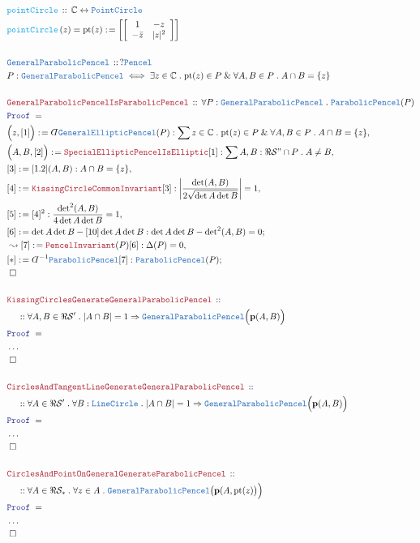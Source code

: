 \documentclass[12pt]{scrartcl}
\newcommand{\TYPE}[1]{\textcolor{NavyBlue}{\mathtt{#1}}}
\newcommand{\FUNC}[1]{\textcolor{Cerulean}{\mathtt{#1}}}
\newcommand{\LOGIC}[1]{\textcolor{Blue}{\mathtt{#1}}}
\newcommand{\THM}[1]{\textcolor{Maroon}{\mathtt{#1}}}
\renewcommand{\.}{\; . \;}
\newcommand{\de}{: \kern 0.1pc =}
\newcommand{\Act}[1]{\left( #1 \right)}
\newcommand{\Theorem}[2]{& \THM{#1} \, :: \, #2 \\ & \Proof = \\ }
\newcommand{\DeclareType}[2]{& \TYPE{#1} \, :: \, #2 \\}
\newcommand{\DefineType}[3]{& #1 : \TYPE{#2} \iff #3 \\}
\newcommand{\DeclareFunc}[2]{& \FUNC{#1} \, :: \, #2 \\}
\newcommand{\DefineNamedFunc}[4]{&  \FUNC{#1}\Act{#2} = #3 \de #4 \\}
\newcommand{\NewLine}{\\ & \kern 1pc}
\newcommand{\Page}[1]{ \begin{align*} #1 \end{align*}   }
\newcommand{ \bd }{ \ByDef }
\newcommand{\NoProof}{ & \ldots \\ \EndProof}
\renewcommand{\And}{\; \& \;}
\newcommand{\Imply}{\Rightarrow}
\newcommand{\Complex}{\mathbb{C}}
\newcommand{\ToBij}{\leftrightarrow}
\newcommand{\Say}[3]{& #1 \de #2 : #3, \\}
\newcommand{\Conclude}[3]{& #1 \de #2 : #3; \\}
\newcommand{\Derive}[3]{& \leadsto #1 \de #2 : #3, \\}
\newcommand{\QED}{\; \square}
\newcommand{\EndProof}{& \QED \\}
\newcommand{\ByDef}{\rotatebox[origin=c]{-180}{$D$}}%
\newcommand{\Proof}{\LOGIC{Proof} \; }
\renewcommand{\S}{\mathcal{S}}
\newcommand{\p}{\mathbf{p}}
\begin{document}
\Page{
	\DeclareFunc{pointCircle}{\Complex \ToBij \TYPE{PointCircle}}
	\DefineNamedFunc{pointCircle}{z}{\mathrm{pt}(z)}
	{
		\left[ \left[
			\begin{array}{cc}
			1 & -z \\
			- \bar z &  |z|^2 
			\end{array}
		\right] \right]
	}
	\\
	\DeclareType{GeneralParabolicPencel}{?\TYPE{Pencel}}
	\DefineType{P}{GeneralParabolicPencel}
	{
		\exists z \in \Complex \.
		\mathrm{pt}(z) \in P \And
		\forall A,B \in P \. 
		A \cap B = \{z\}
	}
	\\
	\Theorem{GeneralParabolicPencelIsParabolicPencel}
	{
		\forall P : \TYPE{GeneralParabolicPencel} \.
		\TYPE{ParabolicPencel}(P) 
	}
	\Say{\Big(z,[1]\Big)}
	{ \bd \TYPE{GeneralEllipticPencel}(P) }
	{ 
		\sum z \in \Complex \. 
		\mathrm{pt}(z) \in P \And 
		\forall A,B \in P \. 
			A \cap B = \{z\} 
	}
	\Say{\Big(A,B,[2]\Big)}{\THM{SpecialEllipticPencelIsElliptic}[1]}
	{
		\sum A,B : \Re \S" \cap P \. A \neq B
	}
	\Say{[3]}{[1.2](A,B)}{A \cap B = \{z\}}
	\Say{[4]}{ \THM{KissingCircleCommonInvariant}[3]  }
	{
		\left|\frac{\det(A,B) }{2\sqrt{\det A \det B}}\right| = 1
	}
	\Say{[5]}{[4]^2}{  \frac{{\det}^2(A,B)}{4\det A \det B} = 1  }
	\Conclude{[6]}{ \det A \det B - [10] \det A \det B  }
	{
		\det A \det B - {\det}^2(A,B)  = 0
	}
	\Derive{[7]}{\THM{PencelInvariant}(P)[6]}{\Delta(P) = 0}
	\Conclude{[*]}{\bd^{-1} \TYPE{ParabolicPencel}[7]}
	{
		\TYPE{ParabolicPencel}(P)
	}
	\EndProof
	\\
	\Theorem{KissingCirclesGenerateGeneralParabolicPencel}
	{
		\NewLine ::
		\forall A,B \in \Re \S' \.
		|A \cap B| = 1 \Imply
		\TYPE{GeneralParabolicPencel}\Big( \p(A,B)  \Big)
	}
	\NoProof
	\\
	\Theorem{CirclesAndTangentLineGenerateGeneralParabolicPencel}
	{
		\NewLine ::
		\forall A \in \Re \S' \.
		\forall B : \TYPE{LineCircle} \.
		|A \cap B| = 1 \Imply
		\TYPE{GeneralParabolicPencel}\Big( \p(A,B)  \Big)
	}
	\NoProof
	\\
	\Theorem{CirclesAndPointOnGeneralGenerateParabolicPencel}
	{
		\NewLine ::
		\forall A \in \Re \S_* \.
		\forall z \in A \.
		\TYPE{GeneralParabolicPencel}\big( \p(A,\mathrm{pt}(z)\big)  \Big)
	}
	\NoProof
}
\end{document}
